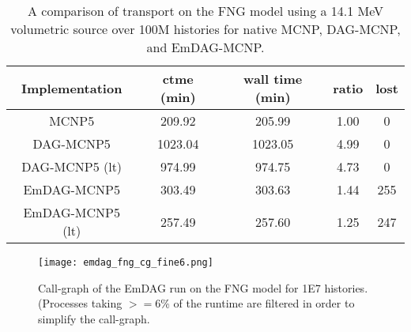 \begin{table}[H]
  \small
  \begin{center}
        \begin{tabular}{|c|c|c|c|c|}
      \hline
      \textbf{Implementation} & \textbf{ctme (min)} & \textbf{wall time (min)} & \textbf{ratio} & \textbf{lost} \\
      \hline
      MCNP5 & 209.92 & 205.99 &  1.00 & 0 \\
      \hline
      DAG-MCNP5 & 1023.04 & 1023.05 & 4.99 & 0  \\
      \hline
      DAG-MCNP5 (lt) & 974.99 & 974.75 & 4.73 & 0  \\
      \hline      
      EmDAG-MCNP5 & 303.49 & 303.63 & 1.44 & 255  \\
      \hline
      EmDAG-MCNP5 (lt) & 257.49 & 257.60  & 1.25 & 247 \\
      \hline
    \end{tabular} 
    \caption{A comparison of transport on the FNG model using a 14.1 MeV
      volumetric source over 100M histories for native MCNP, DAG-MCNP, and
      EmDAG-MCNP.}
    \label{fngemdag}
  \end{center}
\end{table}


\begin{figure}
  \centering
  \texttt{[image: emdag\_fng\_cg\_fine6.png]}
  \caption{Call-graph of the EmDAG run on the FNG model for 1E7
    histories. (Processes taking $>=$6\% of the runtime are filtered in order to
    simplify the call-graph.}
  \label{emdag-fng-coarse}  
\end{figure}


